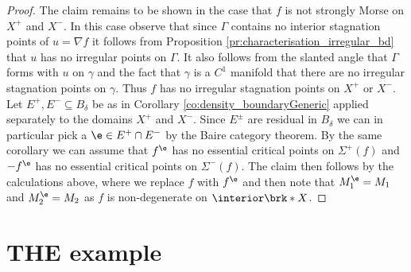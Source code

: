 \begin{proof}
  The claim remains to be shown in the case that $f$ is not strongly Morse on $X^+$ and $X^-$. In this case 
  observe that since $\Gamma$ contains no interior stagnation points of $u=\nabla f$ it follows from Proposition \ref{pr:characterisation_irregular_bd}
  that $u$ has no irregular points on $\Gamma$. It also follows from the slanted angle 
  that $\Gamma$ forms with $u$ on
  $\gamma$ and the fact that $\gamma$ is a $C^1$ manifold that there are no irregular stagnation points on $\gamma$.
  Thus $f$ has no irregular stagnation points on $X^+$ or $X^-$.
  Let $E^+,E^-\subseteq B_\delta$ be as in Corollary \ref{co:density_boundaryGeneric} applied separately to the domains $X^+$ and $X^-$.
  Since $E^\pm$ are residual in $B_\delta$ we can in particular pick a $\e\in E^+\cap E^-$ by the Baire category theorem.
  By the same corollary we can assume that $f^\e$ has no essential critical points on
  $\Sigma^+(f)$ and $-f^\e$ has no essential critical points on $\Sigma^-(f)$.
  The claim then follows by the calculations above, where we replace
  $f$ with $f^\e$ and then note that $M_1^\e=M_1$ and $M_2^\e=M_2$ as $f$ is non-degenerate on $\interior\brk*{X}$.
\end{proof}


\section{THE example}

